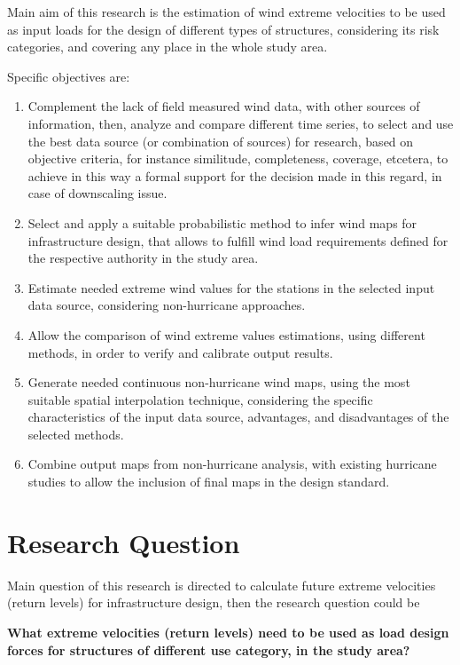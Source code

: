 \documentclass[12pt,oneside]{reedthesis}
\begin{document}
Main aim of this research is the estimation of wind extreme velocities to be used as input loads for the design of different types of structures, considering its risk categories, and covering any place in the whole study area.

Specific objectives are:
\begin{enumerate}
\def\labelenumi{\arabic{enumi}.}
\item
  Complement the lack of field measured wind data, with other sources of information, then, analyze and compare different time series, to select and use the best data source (or combination of sources) for research, based on objective criteria, for instance similitude, completeness, coverage, etcetera, to achieve in this way a formal support for the decision made in this regard, in case of downscaling issue.
\item
  Select and apply a suitable probabilistic method to infer wind maps for infrastructure design, that allows to fulfill wind load requirements defined for the respective authority in the study area.
\item
  Estimate needed extreme wind values for the stations in the selected input data source, considering non-hurricane approaches.
\item
  Allow the comparison of wind extreme values estimations, using different methods, in order to verify and calibrate output results.
\item
  Generate needed continuous non-hurricane wind maps, using the most suitable spatial interpolation technique, considering the specific characteristics of the input data source, advantages, and disadvantages of the selected methods.
\item
  Combine output maps from non-hurricane analysis, with existing hurricane studies to allow the inclusion of final maps in the design standard.
\end{enumerate}
\hypertarget{research-question}{%
\section{Research Question}\label{research-question}}

Main question of this research is directed to calculate future extreme velocities (return levels) for infrastructure design, then the research question could be

\textbf{What extreme velocities (return levels) need to be used as load design forces for structures of different use category, in the study area?}
\end{document}

